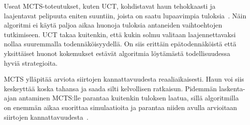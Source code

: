 \documentclass[12pt,finnish]{tktltiki2}
\theoremstyle{definition}
\theoremstyle{remark}
\begin{document}
Useat MCTS-toteutukset, kuten UCT, kohdistavat haun tehokkaasti ja laajentavat pelipuuta eniten suuntiin, joista on saatu lupaavimpia tuloksia~\cite{browne}. Näin algoritmi ei käytä paljoa aikaa huonoja tuloksia antaneiden vaihtoehtojen tutkimiseen. UCT takaa kuitenkin, että kukin solmu valitaan laajennettavaksi nollaa suuremmalla todennäköisyydellä. On siis erittäin epätodennäköistä että yksittäiset huonot kokemukset estävät algoritmia löytämästä todellisuudessa hyviä strategioita.

MCTS ylläpitää arviota siirtojen kannattavuudesta reaaliaikaisesti. Haun voi siis keskeyttää koska tahansa ja saada silti kelvollisen ratkaisun. Pidemmän laskenta-ajan antaminen MCTS:lle parantaa kuitenkin tuloksen laatua, sillä algoritmilla on enemmän aikaa suorittaa simulaatioita ja parantaa niiden avulla arvioitaan siirtojen kannattavuudesta~\cite{browne}.


%
%
% 
%







% 
\end{document}
